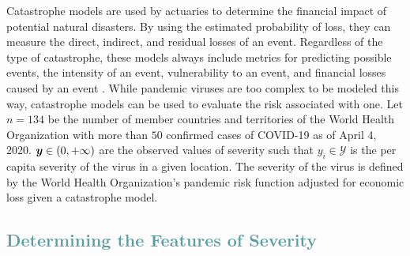 \documentclass[12pt]{article}
\begin{document}
Catastrophe models are used by actuaries to determine the financial impact of potential natural disasters. By using the estimated probability of loss, they can measure the direct, indirect, and residual losses of an event. Regardless of the type of catastrophe, these models always include metrics for predicting possible events, the intensity of an event, vulnerability to an event, and financial losses caused by an event \cite{catModels}. While pandemic viruses are too complex to be modeled this way, catastrophe models can be used to evaluate the risk associated with one. Let $n = 134$ be the number of member countries and territories of the World Health Organization with more than $50$ confirmed cases of COVID-19 as of April 4, 2020. $\boldsymbol{y} \in (0, +\infty)$ are the observed values of severity such that $y_i \in \mathcal{Y}$ is the per capita severity of the virus in a given location. The severity of the virus is defined by the World Health Organization's pandemic risk function adjusted for economic loss given a catastrophe model.


\textcolor{CadetBlue}{\section{Determining the Features of Severity}}
\end{document}
